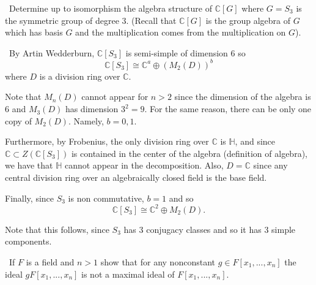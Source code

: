 \documentclass[12pt]{AlgebraQual}
\begin{document}
\begin{problem} $\,$
Determine up to isomorphism the algebra structure of $\mathbb{C}[G]$ where $G=S_3$ is the symmetric group of degree $3.$ (Recall that $\mathbb{C}[G]$ is the group algebra of $G$ which has basis $G$ and the multiplication comes from the multiplication on $G$).
\end{problem}


\begin{solution}$\,$
By Artin Wedderburn, $\mathbb{C}[S_3]$ is semi-simple of dimension $6$ so $$\mathbb{C}[S_3]\cong\mathbb{C}^a\oplus (M_2(D))^b$$ where $D$ is a division ring over $\mathbb{C}$.

Note that $M_n(D)$ cannot appear for $n>2$ since the dimension of the algebra is $6$ and $M_3(D)$ has dimension $3^2=9$. For the same reason, there can be only one copy of $M_2(D)$. Namely, $b=0,1$.

Furthermore, by Frobenius, the only division ring over $\mathbb{C}$ is $\mathbb{H}$, and since $\mathbb{C}\subset Z(\mathbb{C}[S_3])$ is contained in the center of the algebra (definition of algebra), we have that $\mathbb{H}$ cannot appear in the decomposition. Also, $D=\mathbb{C}$ since any central division ring over an algebraically closed field is the base field.

Finally, since $S_3$ is non commutative, $b=1$ and so $$\mathbb{C}[S_3]\cong\mathbb{C}^2\oplus M_2(D).$$

\begin{mybox}
Note that this follows, since $S_3$ has $3$ conjugacy classes and so it has $3$ simple components.
\end{mybox}
\end{solution}
\newpage




\begin{problem} $\,$
If $F$ is a field and $n>1$ show that for any nonconstant $g\in F[x_1,...,x_n]$ the ideal $gF[x_1,...,x_n]$ is not a maximal ideal of $F[x_1,...,x_n]$.
\end{problem}
\end{document}
